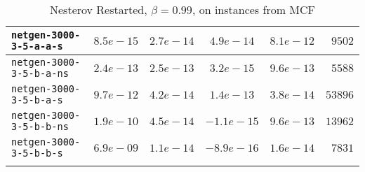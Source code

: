 \begin{center}
\begin{longtable}{|l || c | c | c | c | r|}
\hline
\texttt{netgen-3000-3-5-a-a-s} & $8.5e-15$ & $2.7e-14$ & $4.9e-14$ & $8.1e-12$ & $9502$ \\
\hline
\texttt{netgen-3000-3-5-b-a-ns} & $2.4e-13$ & $2.5e-13$ & $3.2e-15$ & $9.6e-13$ & $5588$ \\
\hline
\texttt{netgen-3000-3-5-b-a-s} & $9.7e-12$ & $4.2e-14$ & $1.4e-13$ & $3.8e-14$ & $53896$ \\
\hline
\texttt{netgen-3000-3-5-b-b-ns} & $1.9e-10$ & $4.5e-14$ & $-1.1e-15$ & $9.6e-13$ & $13962$ \\
\hline
\texttt{netgen-3000-3-5-b-b-s} & $6.9e-09$ & $1.1e-14$ & $-8.9e-16$ & $1.6e-14$ & $7831$ \\
\hline
\caption{Nesterov Restarted, $\beta=0.99$, on instances from MCF}
\label{table:NesterovRestartedDIMACS}
\end{longtable}
\end{center}
